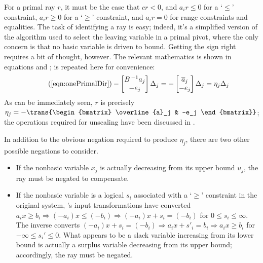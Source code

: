 For a primal ray $r$, it must be the case that $c r < 0$,
and $a_i r \leq 0$ for a `$\leq$' constraint,
$a_i r \geq 0$ for a `$\geq$' constraint, and
$a_i r = 0$ for range constraints and equalities.
The task of identifying a ray is easy; indeed, it's a simplified version of the
algorithm used to select the leaving variable in a primal pivot, where the only
concern is that no basic variable is driven to bound.
Getting the sign right requires a bit of thought, however.
The relevant mathematics is shown in equations  and
;  is repeated here for
convenience:
\begin{equation} \tag{\ref{eqn:onePrimalDir}}
  -\begin{bmatrix} B^{\,-1}a_j \\ -e_j \end{bmatrix} \Delta_j =
  -\begin{bmatrix} \overline{a}_j \\ -e_j \end{bmatrix} \Delta_j =
  \eta_j\Delta_j
\end{equation}
As can be immediately seen, $r$ is precisely
$\eta_j = -\trans{\begin{bmatrix} \overline{a}_j & -e_j \end{bmatrix}}$;
the operations
required for unscaling have been discussed in .

In addition to the obvious negation required to produce $\eta_j$, there are
two other possible negations to consider.
\begin{itemize}
  \item
  If the nonbasic variable $x_j$ is actually decreasing from its upper bound
  $u_j$, the ray must be negated to compensate.

  \item
  If the nonbasic variable is a logical $s_i$ associated with a `$\geq$'
  constraint in the original system, \dylp's input transformations have
  converted
  $a_i x \geq b_i \Rightarrow (-a_i)x \leq (-b_i)
    \Rightarrow (-a_i)x + s_i = (-b_i)$
  for $0 \leq s_i \leq \infty$.
  The inverse converts
  $(-a_i)x + s_i = (-b_i) \Rightarrow a_i x + s'_i = b_i
    \Rightarrow a_i x \geq b_i$
  for $-\infty \leq s_i' \leq 0$.
  What appears to be a slack variable increasing from its lower bound is
  actually a surplus variable decreasing from its upper bound; accordingly, the
  ray must be negated.
\end{itemize}

